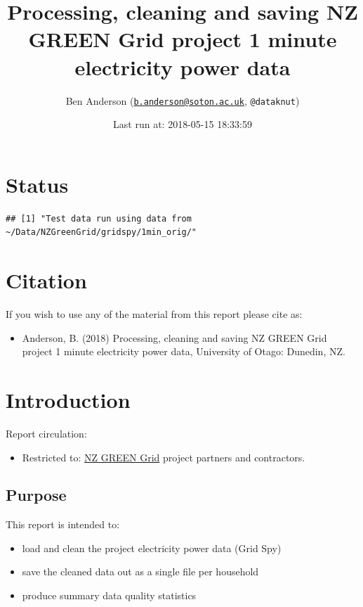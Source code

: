 \documentclass[]{article}
\title{Processing, cleaning and saving NZ GREEN Grid project 1 minute
electricity power data}
\author{Ben Anderson
(\href{mailto:b.anderson@soton.ac.uk}{\nolinkurl{b.anderson@soton.ac.uk}},
\texttt{@dataknut})}
\date{Last run at: 2018-05-15 18:33:59}
\providecommand{\tightlist}{%
  \setlength{\itemsep}{0pt}\setlength{\parskip}{0pt}}
\begin{document}
\maketitle

{
\setcounter{tocdepth}{2}
\tableofcontents
}
\newpage

\section{Status}\label{status}

\begin{verbatim}
## [1] "Test data run using data from ~/Data/NZGreenGrid/gridspy/1min_orig/"
\end{verbatim}

\section{Citation}\label{citation}

If you wish to use any of the material from this report please cite as:

\begin{itemize}
\tightlist
\item
  Anderson, B. (2018) Processing, cleaning and saving NZ GREEN Grid
  project 1 minute electricity power data, University of Otago: Dunedin,
  NZ.
\end{itemize}

\newpage

\section{Introduction}\label{introduction}

Report circulation:

\begin{itemize}
\tightlist
\item
  Restricted to:
  \href{https://www.otago.ac.nz/centre-sustainability/research/energy/otago050285.html}{NZ
  GREEN Grid} project partners and contractors.
\end{itemize}

\subsection{Purpose}\label{purpose}

This report is intended to:

\begin{itemize}
\tightlist
\item
  load and clean the project electricity power data (Grid Spy)
\item
  save the cleaned data out as a single file per household
\item
  produce summary data quality statistics
\end{itemize}
\end{document}
